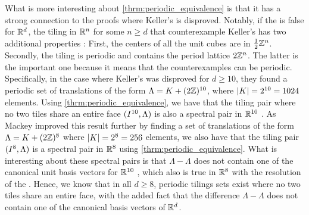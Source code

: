 \documentclass[../thesis.tex]{subfiles}
\begin{document}
What is more interesting about \cref{thrm:periodic_equivalence} is that it has a strong connection to the proofs where Keller's  is disproved. Notably, if the  is false for $\mathbb{R}^d$, the tiling in $\mathbb{R}^n$ for some $n\geq d$ that counterexample Keller's  has two additional properties \cite{lagariasKellerCubetilingConjecture1992}: First, the centers of all the unit cubes are in $\frac{1}{2}\mathbb{Z}^n$. Secondly, the tiling is periodic and contains the period lattice $2\mathbb{Z}^n$. The latter is the important one because it means that the counterexamples can be periodic. Specifically, in the case where Keller's  was disproved for $d\geq10$, they found a periodic set of translations of the form $\Lambda= K + (2\mathbb{Z})^{10}$, where $|K| = 2^{10} = 1024$ elements. Using \cref{thrm:periodic_equivalence}, we have that the tiling pair where no two tiles share an entire face $(I^{10},\Lambda)$ is also a spectral pair in $\mathbb{R}^{10}$ \cite{jorgensenSpectralPairsCartesian2001}. As Mackey \cite{mackeyCubeTilingDimension2002} improved this result further by finding a set of translations of the form $\Lambda= K + (2\mathbb{Z})^{8}$ where $|K| = 2^{8} = 256$ elements, we also have that the tiling pair $(I^{8},\Lambda)$ is a spectral pair in $\mathbb{R}^8$ using \cref{thrm:periodic_equivalence}. What is interesting about these spectral pairs is that $\Lambda-\Lambda$ does not contain one of the canonical unit basis vectors for $\mathbb{R}^{10}$ \cite{jorgensenSpectralPairsCartesian2001}, which also is true in $\mathbb{R}^{8}$ with the resolution of the  \cite{brakensiekResolutionKellerConjecture2020}. Hence, we know that in all $d\geq8$, periodic tilings sets exist where no two tiles share an entire face, with the added fact that the difference $\Lambda-\Lambda$ does not contain one of the canonical basis vectors of $\mathbb{R}^d$.
\begin{remark}
\end{remark}
\end{document}
